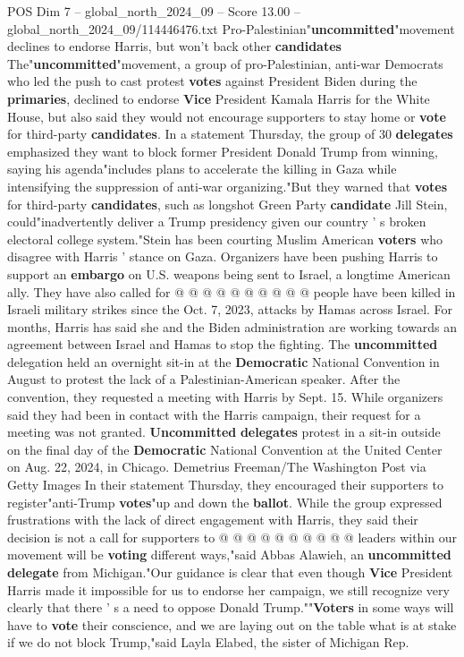 \begin{textsample}{POS Dim 7 – global\_north\_2024\_09 – Score 13.00 – global\_north\_2024\_09/114446476.txt}  \label{ex:f7_pos_075}
Pro-Palestinian"\textbf{uncommitted}"movement declines to endorse Harris, but won't back other \textbf{candidates} The"\textbf{uncommitted}"movement, a group of pro-Palestinian, anti-war Democrats who led the push to cast protest \textbf{votes} against President Biden during the \textbf{primaries}, declined to endorse \textbf{Vice} President Kamala Harris for the White House, but also said they would not encourage supporters to stay home or \textbf{vote} for third-party \textbf{candidates}.
In a statement Thursday, the group of 30 \textbf{delegates} emphasized they want to block former President Donald Trump from winning, saying his agenda"includes plans to accelerate the killing in Gaza while intensifying the suppression of anti-war organizing."But they warned that \textbf{votes} for third-party \textbf{candidates}, such as longshot Green Party \textbf{candidate} Jill Stein, could"inadvertently deliver a Trump presidency given our country ' s broken electoral college system."Stein has been courting Muslim American \textbf{voters} who disagree with Harris ' stance on Gaza.
Organizers have been pushing Harris to support an \textbf{embargo} on U.S. weapons being sent to Israel, a longtime American ally.
They have also called for @ @ @ @ @ @ @ @ @ @ people have been killed in Israeli military strikes since the Oct. 7, 2023, attacks by Hamas across Israel.
For months, Harris has said she and the Biden administration are working towards an agreement between Israel and Hamas to stop the fighting.
The \textbf{uncommitted} delegation held an overnight sit-in at the \textbf{Democratic} National Convention in August to protest the lack of a Palestinian-American speaker.
After the convention, they requested a meeting with Harris by Sept. 15.
While organizers said they had been in contact with the Harris campaign, their request for a meeting was not granted. \textbf{Uncommitted} \textbf{delegates} protest in a sit-in outside on the final day of the \textbf{Democratic} National Convention at the United Center on Aug. 22, 2024, in Chicago.
Demetrius Freeman/The Washington Post via Getty Images In their statement Thursday, they encouraged their supporters to register"anti-Trump \textbf{votes}"up and down the \textbf{ballot}.
While the group expressed frustrations with the lack of direct engagement with Harris, they said their decision is not a call for supporters to @ @ @ @ @ @ @ @ @ @ leaders within our movement will be \textbf{voting} different ways,"said Abbas Alawieh, an \textbf{uncommitted} \textbf{delegate} from Michigan."Our guidance is clear that even though \textbf{Vice} President Harris made it impossible for us to endorse her campaign, we still recognize very clearly that there ' s a need to oppose Donald Trump.""\textbf{Voters} in some ways will have to \textbf{vote} their conscience, and we are laying out on the table what is at stake if we do not block Trump,"said Layla Elabed, the sister of Michigan Rep.

\end{textsample}
